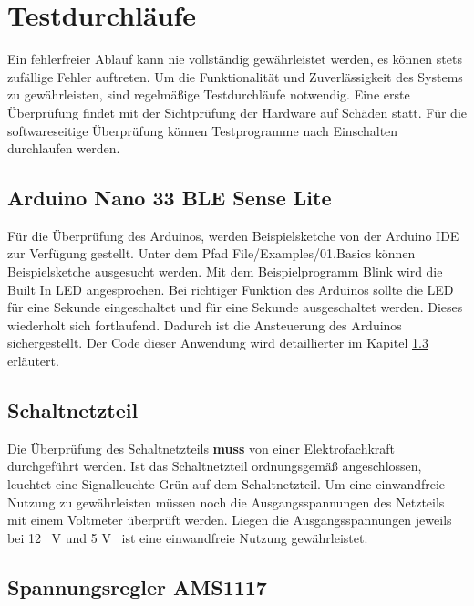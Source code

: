 %
%
%
\chapter{Testdurchläufe}

Ein fehlerfreier Ablauf kann nie vollständig gewährleistet werden, es können stets zufällige Fehler auftreten. Um die Funktionalität und Zuverlässigkeit des Systems zu gewährleisten, sind regelmäßige Testdurchläufe notwendig. Eine erste Überprüfung findet mit der Sichtprüfung der Hardware auf Schäden statt. Für die softwareseitige Überprüfung können Testprogramme nach Einschalten durchlaufen werden.  


\section{Arduino Nano 33 BLE Sense Lite}

Für die Überprüfung des Arduinos, werden Beispielsketche von der Arduino IDE zur Verfügung gestellt. Unter dem Pfad File/Examples/01.Basics können Beispielsketche ausgesucht werden. Mit dem Beispielprogramm Blink wird die Built In LED angesprochen. Bei richtiger Funktion des Arduinos sollte die LED für eine Sekunde eingeschaltet und für eine Sekunde ausgeschaltet werden. Dieses wiederholt sich fortlaufend. Dadurch ist die Ansteuerung des Arduinos sichergestellt.
Der Code dieser Anwendung wird detaillierter im Kapitel \ref{} erläutert.

\section{Schaltnetzteil}

Die Überprüfung des Schaltnetzteils \textbf{muss} von einer Elektrofachkraft durchgeführt werden. Ist das Schaltnetzteil ordnungsgemäß angeschlossen, leuchtet eine Signalleuchte Grün auf dem Schaltnetzteil. Um eine einwandfreie Nutzung zu gewährleisten müssen noch die Ausgangsspannungen des Netzteils mit einem Voltmeter überprüft werden. Liegen die Ausgangsspannungen jeweils bei 12 \ V und 5 V \ ist eine einwandfreie Nutzung gewährleistet. 


\section{Spannungsregler AMS1117}

